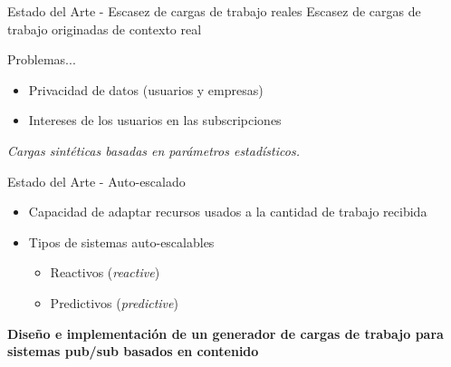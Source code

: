 \documentclass[12pt, spanish]{beamer}
\begin{document}
\begin{frame}{Estado del Arte - Escasez de cargas de trabajo reales}
    Escasez de cargas de trabajo originadas de contexto real\vspace{1cm}
    
    Problemas...
    \begin{itemize}
        \item Privacidad de datos (usuarios y empresas)
        \item Intereses de los usuarios en las subscripciones\vspace{1cm}
    \end{itemize}
    
    \textit{Cargas sintéticas basadas en parámetros estadísticos.}
\end{frame}

\begin{frame}{Estado del Arte - Auto-escalado} %

    \begin{itemize}
        \item Capacidad de adaptar recursos usados a la cantidad de trabajo recibida\vspace{1cm}
        \item Tipos de sistemas auto-escalables
        \begin{itemize}
            \item Reactivos (\textit{reactive})
            \item Predictivos (\textit{predictive})
        \end{itemize}

    \end{itemize}
\end{frame}


\begin{frame}%
    \begin{center}
        {\Large\textbf{Diseño e implementación de un generador de cargas de trabajo para sistemas pub/sub basados en contenido}}
    \end{center}
\end{frame}
\end{document}
